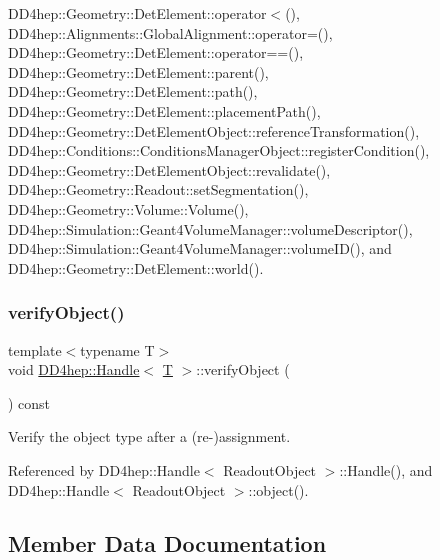 D\+D4hep\+::\+Geometry\+::\+Det\+Element\+::operator$<$(), D\+D4hep\+::\+Alignments\+::\+Global\+Alignment\+::operator=(), D\+D4hep\+::\+Geometry\+::\+Det\+Element\+::operator==(), D\+D4hep\+::\+Geometry\+::\+Det\+Element\+::parent(), D\+D4hep\+::\+Geometry\+::\+Det\+Element\+::path(), D\+D4hep\+::\+Geometry\+::\+Det\+Element\+::placement\+Path(), D\+D4hep\+::\+Geometry\+::\+Det\+Element\+Object\+::reference\+Transformation(), D\+D4hep\+::\+Conditions\+::\+Conditions\+Manager\+Object\+::register\+Condition(), D\+D4hep\+::\+Geometry\+::\+Det\+Element\+Object\+::revalidate(), D\+D4hep\+::\+Geometry\+::\+Readout\+::set\+Segmentation(), D\+D4hep\+::\+Geometry\+::\+Volume\+::\+Volume(), D\+D4hep\+::\+Simulation\+::\+Geant4\+Volume\+Manager\+::volume\+Descriptor(), D\+D4hep\+::\+Simulation\+::\+Geant4\+Volume\+Manager\+::volume\+I\+D(), and D\+D4hep\+::\+Geometry\+::\+Det\+Element\+::world().

\hypertarget{class_d_d4hep_1_1_handle_a0001c6eae622a62fb638a9e0a07ac150}{}\label{class_d_d4hep_1_1_handle_a0001c6eae622a62fb638a9e0a07ac150} 
\subsubsection{\texorpdfstring{verify\+Object()}{verifyObject()}}
{\footnotesize\ttfamily template$<$typename T$>$ \\
void \hyperlink{class_d_d4hep_1_1_handle}{D\+D4hep\+::\+Handle}$<$ \hyperlink{class_t}{T} $>$\+::verify\+Object (\begin{DoxyParamCaption}{ }\end{DoxyParamCaption}) const}



Verify the object type after a (re-\/)assignment. 



Referenced by D\+D4hep\+::\+Handle$<$ Readout\+Object $>$\+::\+Handle(), and D\+D4hep\+::\+Handle$<$ Readout\+Object $>$\+::object().



\subsection{Member Data Documentation}
\hypertarget{class_d_d4hep_1_1_handle_a207411705e86b0f4053357c7a8b5532e}{}\label{class_d_d4hep_1_1_handle_a207411705e86b0f4053357c7a8b5532e} 
